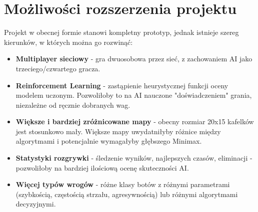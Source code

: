\section{Możliwości rozszerzenia projektu}

Projekt w obecnej formie stanowi kompletny prototyp, jednak istnieje szereg kierunków, w których można go rozwinąć:
 
\begin{itemize}
    \item \textbf{Multiplayer sieciowy} - gra dwuosobowa przez sieć, z zachowaniem AI jako trzeciego/czwartego gracza.
    \item \textbf{Reinforcement Learning} - zastąpienie heurystycznej funkcji oceny modelem uczonym. 
    Pozwoliłoby to na AI nauczone "doświadczeniem" grania, niezależne od ręcznie dobranych wag.
    \item \textbf{Większe i bardziej zróżnicowane mapy} - obecny rozmiar 20x15 kafelków jest stosunkowo mały. 
    Większe mapy uwydatniłyby różnice między algorytmami i potencjalnie wymagałyby głębszego Minimax.
    \item \textbf{Statystyki rozgrywki} - śledzenie wyników, najlepszych czasów, eliminacji - pozwoliłoby na bardziej ilościową 
    ocenę skuteczności AI.
    \item \textbf{Więcej typów wrogów} - różne klasy botów z różnymi parametrami (szybkością, częstością strzału, agresywnością) 
    lub różnymi algorytmami decyzyjnymi.
\end{itemize}